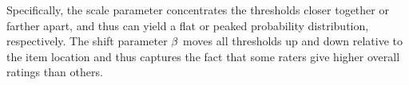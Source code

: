 \documentclass[a4paper,usenames,dvipsnames]{article}
\newenvironment{revision}{\color{black}}{\color{black}}
\newenvironment{revisionN}{\color{black}}{\color{black}}
\begin{document}
\begin{revisionN}%
Specifically, the scale parameter concentrates the thresholds closer together or farther apart, and thus can yield a flat or peaked probability distribution, respectively.
\end{revisionN}
The shift parameter $\beta$ moves all thresholds up and down relative to the item location and thus captures the fact that some raters give higher overall ratings than others.
\end{document}
